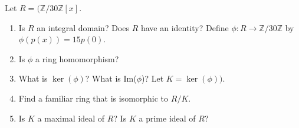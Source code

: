 \documentclass[12pt,letterpaper,boxed]{hmcpset}
\begin{document}
\begin{solution}
\end{solution}

\clearpage

\begin{problem}[18.1.27]
Let $R = (\mathbb{Z}/30\mathbb{Z}[x]$.
\begin{enumerate}[label=\alph*]
\item Is $R$ an integral domain? Does  $R$ have an identity?
\newline Define $\phi: R \rightarrow \mathbb{Z}/30\mathbb{Z}$ by $\phi(p(x)) = 15p(0)$.
\item Is $\phi$ a ring homomorphism?
\item What is $\ker(\phi)$? What is Im($\phi$)?
\newline Let $K = \ker(\phi))$.
\item Find a familiar ring that is isomorphic to $R/K$.
\item Is $K$ a maximal ideal of $R$? Is $K$ a prime ideal of $R$?
\end{enumerate}
\end{problem}

\begin{solution}
\end{solution}
\end{document}
